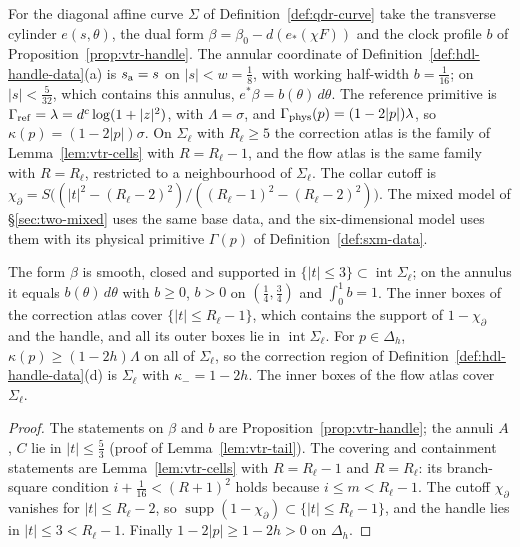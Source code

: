 \begin{construction}\label{cons:shd-handle-data}
For the diagonal affine curve $\Sigma$ of Definition~\ref{def:qdr-curve} take the transverse cylinder
$e(s,\theta)$, the dual form $\beta=\beta_0-d(e_*(\chi F))$ and the clock profile $b$ of Proposition~\ref{prop:vtr-handle}.
The annular coordinate of Definition~\ref{def:hdl-handle-data}(a) is $s_{\rm a}=s$ on $|s|<w=\frac18$, with working
half-width $b=\frac1{16}$; on $|s|<\frac5{32}$, which contains this annulus, $e^*\beta=b(\theta)\,d\theta$. The reference
primitive is $\Gamma_{\rm ref}=\lambda=d^c\log(1+|z|^2)$, with $\Lambda=\sigma$, and $\Gamma_{\rm phys}(p)=(1-2|p|)\lambda$,
so $\kappa(p)=(1-2|p|)\sigma$. On $\Sigma_\ell$ with $R_\ell\ge5$ the correction atlas is the family of
Lemma~\ref{lem:vtr-cells} with $R=R_\ell-1$, and the flow atlas is the same family with $R=R_\ell$, restricted to a
neighbourhood of $\Sigma_\ell$. The collar cutoff is
$\chi_\partial=S\bigl((|t|^2-(R_\ell-2)^2)/((R_\ell-1)^2-(R_\ell-2)^2)\bigr)$. The mixed model of \S\ref{sec:two-mixed} uses
the same base data, and the six-dimensional model uses them with its physical primitive $\Gamma(p)$ of
Definition~\ref{def:sxm-data}.
\end{construction}

\begin{lemma}\label{lem:shd-handle-data}
The form $\beta$ is smooth, closed and supported in $\{|t|\le3\}\subset\operatorname{int}\Sigma_\ell$; on the annulus it equals
$b(\theta)\,d\theta$ with $b\ge0$, $b>0$ on $(\frac14,\frac34)$ and $\int_0^1b=1$. The inner boxes of the correction atlas
cover $\{|t|\le R_\ell-1\}$, which contains the support of $1-\chi_\partial$ and the handle, and all its outer boxes lie in
$\operatorname{int}\Sigma_\ell$. For $p\in\Delta_h$, $\kappa(p)\ge(1-2h)\Lambda$ on all of $\Sigma_\ell$, so the correction region
of Definition~\ref{def:hdl-handle-data}(d) is $\Sigma_\ell$ with $\kappa_-=1-2h$. The inner boxes of the flow atlas cover
$\Sigma_\ell$.
\end{lemma}
\begin{proof}
The statements on $\beta$ and $b$ are Proposition~\ref{prop:vtr-handle}; the annuli $A$, $C$ lie in $|t|\le\frac53$
(proof of Lemma~\ref{lem:vtr-tail}). The covering and containment statements are Lemma~\ref{lem:vtr-cells} with
$R=R_\ell-1$ and $R=R_\ell$: its branch-square condition $i+\frac1{16}<(R+1)^2$ holds because $i\le m<R_\ell-1$. The
cutoff $\chi_\partial$ vanishes for $|t|\le R_\ell-2$, so $\operatorname{supp}(1-\chi_\partial)\subset\{|t|\le R_\ell-1\}$, and the
handle lies in $|t|\le3<R_\ell-1$. Finally $1-2|p|\ge1-2h>0$ on $\Delta_h$.
\end{proof}

